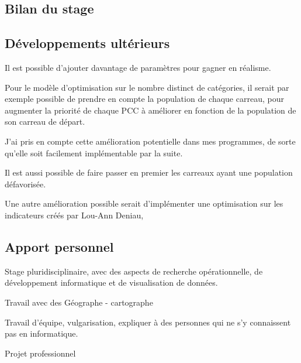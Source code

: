 \subsection{Bilan du stage}

\subsection{Développements ultérieurs}

Il est possible d'ajouter davantage de paramètres pour gagner en réalisme. 

Pour le modèle d'optimisation sur le nombre distinct de catégories, il serait par exemple possible de prendre en compte la population de chaque carreau, pour augmenter la priorité de chaque PCC à améliorer en fonction de la population de son carreau de départ.

J'ai pris en compte cette amélioration potentielle dans mes programmes, de sorte qu'elle soit facilement implémentable par la suite.

Il est aussi possible de faire passer en premier les carreaux ayant une population défavorisée.

Une autre amélioration possible serait d'implémenter une optimisation sur les indicateurs créés par Lou-Ann Deniau, 

\subsection{Apport personnel}

Stage pluridisciplinaire, avec des aspects de recherche opérationnelle, de développement informatique et de visualisation de données.

Travail avec des Géographe - cartographe

Travail d'équipe, vulgarisation, expliquer à des personnes qui ne s'y connaissent pas en informatique.


Projet professionnel